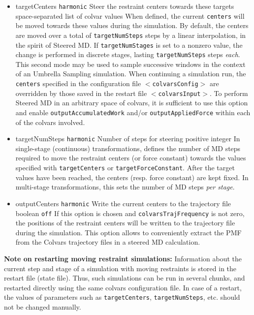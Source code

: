 \begin{itemize}

\item %
  \key
    {targetCenters}{%
    \texttt{harmonic}}{%
    Steer the restraint centers towards these
    targets}{%
    space-separated list of colvar values}{%
    When defined, the current \texttt{centers} will be moved towards
    these values during the simulation.
    By default, the centers are moved over a total of
    \texttt{targetNumSteps} steps by a linear interpolation, in the
    spirit of Steered MD.
    If \texttt{targetNumStages} is set to a nonzero value, the
    change is performed in discrete stages, lasting \texttt{targetNumSteps}
    steps \emph{each}. This second mode may be used to sample successive
    windows in the context
    of an Umbrella Sampling simulation.
    When continuing a simulation
    run, the \texttt{centers} specified in the configuration file
    \texttt{$<$colvarsConfig$>$} are overridden by those saved in
    the restart file \texttt{$<$colvarsInput$>$}.
    To perform Steered MD in an arbitrary space of colvars, it is sufficient
    to use this option and enable \texttt{outputAccumulatedWork} and/or
    \texttt{outputAppliedForce} within each of the colvars involved.}

\item %
  \key
    {targetNumSteps}{%
    \texttt{harmonic}}{%
    Number of steps for steering}{%
    positive integer}{%
    In single-stage (continuous) transformations, defines the number of MD
    steps required to move the restraint centers (or force constant)
    towards the values specified with \texttt{targetCenters} or
    \texttt{targetForceConstant}.
    After the target values have been reached, the centers (resp. force
    constant) are kept fixed. In multi-stage transformations, this sets the
    number of MD steps \emph{per stage}.}

\item %
  \keydef
    {outputCenters}{%
    \texttt{harmonic}}{%
    Write the current centers to the trajectory file}{%
    boolean}{%
    \texttt{off}}{%
    If this option is chosen and  \texttt{colvarsTrajFrequency} is not zero, the positions of the restraint centers will be written to the trajectory file during the simulation.
    This option allows to conveniently extract the PMF from the Colvars trajectory files in a steered MD calculation.
}

\end{itemize}

\textbf{Note on restarting moving restraint simulations:} Information
about the current step and stage of a simulation with moving restraints
is stored in the restart file (state file). Thus, such simulations can
be run in several chunks, and restarted directly using the same colvars
configuration file. In case of a restart, the values of parameters such
as \texttt{targetCenters}, \texttt{targetNumSteps}, etc. should not be
changed manually.


